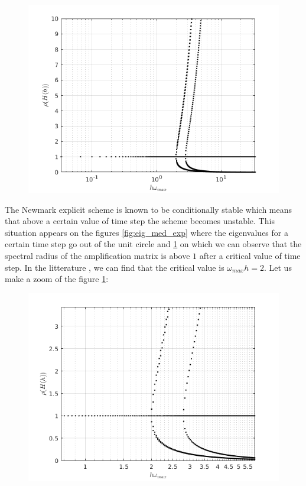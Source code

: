\begin{itemize}
\begin{figure}[H]
\begin{minipage}{.5\textwidth}
  \label{fig:eig_med_exp}
\end{minipage}%
\begin{minipage}{.5\textwidth}
  \centering
  \includegraphics[width=.98\linewidth]{images/spect_rad_med_exp_not_zoom.png}
  \label{fig:spect_rad_med_exp_not_zoom}
\end{minipage}
\end{figure} 
The Newmark explicit scheme is known to be conditionally stable which means that above a certain value of time step the scheme becomes unstable. This situation appears on the figures \ref{fig:eig_med_exp} where the eigenvalues for a certain time step go out of the unit circle and \ref{fig:spect_rad_med_exp_not_zoom} on which we can observe that the spectral radius of the amplification matrix is above $1$ after a critical value of time step. In the litterature \cite{Geradin}, we can find that the critical value is $\omega_{max} h = 2$. Let us make a zoom of the figure \ref{fig:spect_rad_med_exp_not_zoom}:
\begin{figure}[H]
  \centering
  \includegraphics[scale=0.6]{images/spect_rad_med_exp.png}

\end{figure}
\end{itemize}

